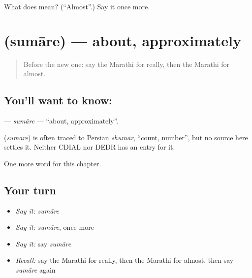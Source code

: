 \begin{tcolorbox}[breakable,colback=teal!4,colframe=teal!35!black,title={Before you move on}]
What does  mean? (\textquotedblleft{}Almost\textquotedblright{}.) Say it once more.
\end{tcolorbox}
\section[\texorpdfstring{\mr{सुमारे} (sumāre)}{सुमारे (sumāre)}]{ (sumāre) — about, approximately}

\label{lesson:MR-C203-sumare}



\begin{quote}
Before the new one: say the Marathi for really, then the Marathi for almost.
\end{quote}

\subsection*{You'll want to know: }
\textbf{} — \emph{sumāre} — \textquotedblleft{}about, approximately\textquotedblright{}.

\begin{cousinweb}
\textbf{} (\emph{sumāre}) is often traced to Persian \emph{shumār}, \textquotedblleft{}count, number\textquotedblright{}, but no source here settles it. Neither CDIAL nor DEDR has an entry for it.
\end{cousinweb}

\begin{grammarlens}[title={What you've built}]
One more word for this chapter.
\end{grammarlens}

\subsection*{Your turn}
\begin{itemize}
\raggedright
  \item \emph{Say it:} \emph{sumāre}
  \item \emph{Say it:} \emph{sumāre}, once more
  \item \emph{Say it:} say \emph{sumāre}
  \item \emph{Recall:} say the Marathi for really, then the Marathi for almost, then say \emph{sumāre} again
\end{itemize}

